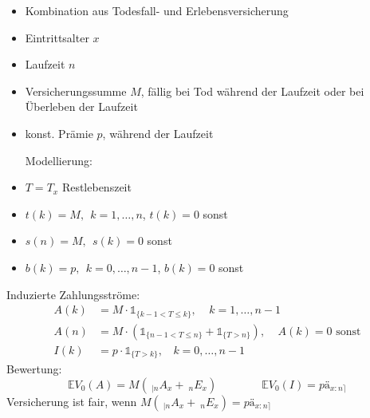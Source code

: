 \begin{enumerate}[(a)]
	\begin{minipage}[t]{9cm}
		\begin{itemize}
			\item Kombination aus Todesfall- und Erlebensversicherung
			\item Eintrittsalter $x$
			\item Laufzeit $n$
			\item Versicherungssumme $M$, fällig bei Tod während der Laufzeit oder bei Überleben der Laufzeit
			\item konst. Prämie $p$, während der Laufzeit
		\end{itemize}
	\end{minipage}
	\begin{minipage}[t]{9cm}
		\begin{itemize}
			\item[Modellierung:]
			\item $T=T_x$ Restlebenszeit
			\item $t(k)=M,~~ k=1,\dots,n$, $t(k)=0$ sonst
			\item $s(n)=M,~~ s(k)=0$ sonst
			\item $b(k)=p,~~ k=0,\dots,n-1$, $b(k)=0$ sonst
		\end{itemize}
	\end{minipage}
	Induzierte Zahlungsströme:
	\begin{equation*}
	\begin{aligned}
		A(k) &= M\cdot \mathbb{1}_{\{k-1<T\le k \}}, ~~~~~k=1,\dots,n-1\\
		A(n) &= M\cdot (\mathbb{1}_{\{n-1<T \le n \}}+\mathbb{1}_{\{T>n\}}), ~~~~~A(k)=0 \text{ sonst}\\
		I(k) &= p\cdot \mathbb{1}_{\{T>k\}},~~~~k=0,\dots,n-1
	\end{aligned}
	\end{equation*}
	Bewertung: \[ \mathds{E}V_0(A)=M(~_{|n}A_x + ~_nE_x) \qquad \qquad \mathds{E}V_0(I)=p ä_{x:n\rceil}\]
	Versicherung ist fair, wenn $M(~_{|n}A_x + ~_nE_x)=p ä_{x:n\rceil}$
\end{enumerate}

